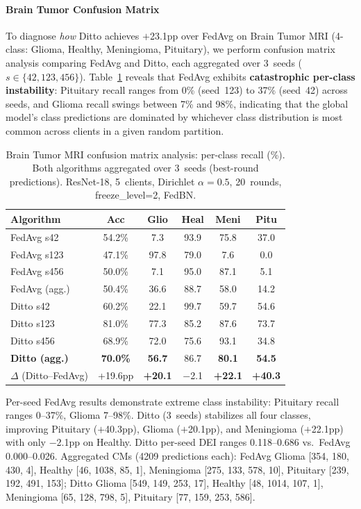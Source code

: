 \documentclass[conference]{IEEEtran}
\begin{document}
\paragraph{Brain Tumor Confusion Matrix}
\label{sec:confusion_matrix_bt}

To diagnose \textit{how} Ditto achieves $+$23.1pp over FedAvg on Brain Tumor MRI (4-class: Glioma, Healthy, Meningioma, Pituitary), we perform confusion matrix analysis comparing FedAvg and Ditto, each aggregated over 3~seeds ($s \in \{42, 123, 456\}$). Table~\ref{tab:confusion_matrix_bt} reveals that FedAvg exhibits \textbf{catastrophic per-class instability}: Pituitary recall ranges from 0\% (seed~123) to 37\% (seed~42) across seeds, and Glioma recall swings between 7\% and 98\%, indicating that the global model's class predictions are dominated by whichever class distribution is most common across clients in a given random partition.

\begin{table}[htbp]
\centering
\caption{Brain Tumor MRI confusion matrix analysis: per-class recall (\%). Both algorithms aggregated over 3~seeds (best-round predictions). ResNet-18, 5~clients, Dirichlet $\alpha{=}0.5$, 20~rounds, freeze\_level=2, FedBN.}
\label{tab:confusion_matrix_bt}
\small
\begin{tabular}{lccccc}
\toprule
\textbf{Algorithm} & \textbf{Acc} & \textbf{Glio} & \textbf{Heal} & \textbf{Meni} & \textbf{Pitu} \\
\midrule
FedAvg s42 & 54.2\% & 7.3 & 93.9 & 75.8 & 37.0 \\
FedAvg s123 & 47.1\% & 97.8 & 79.0 & 7.6 & 0.0 \\
FedAvg s456 & 50.0\% & 7.1 & 95.0 & 87.1 & 5.1 \\
\midrule
FedAvg (agg.) & 50.4\% & 36.6 & 88.7 & 58.0 & 14.2 \\
\midrule
Ditto s42 & 60.2\% & 22.1 & 99.7 & 59.7 & 54.6 \\
Ditto s123 & 81.0\% & 77.3 & 85.2 & 87.6 & 73.7 \\
Ditto s456 & 68.9\% & 72.0 & 75.6 & 93.1 & 34.8 \\
\midrule
\textbf{Ditto (agg.)} & \textbf{70.0\%} & \textbf{56.7} & 86.7 & \textbf{80.1} & \textbf{54.5} \\
\midrule
$\Delta$ (Ditto--FedAvg) & +19.6pp & \textbf{+20.1} & $-$2.1 & \textbf{+22.1} & \textbf{+40.3} \\
\bottomrule
\end{tabular}

\vspace{1mm}
\footnotesize{Per-seed FedAvg results demonstrate extreme class instability: Pituitary recall ranges 0--37\%, Glioma 7--98\%. Ditto (3~seeds) stabilizes all four classes, improving Pituitary ($+$40.3pp), Glioma ($+$20.1pp), and Meningioma ($+$22.1pp) with only $-$2.1pp on Healthy. Ditto per-seed DEI ranges 0.118--0.686 vs.\ FedAvg 0.000--0.026. Aggregated CMs (4209 predictions each): FedAvg Glioma [354, 180, 430, 4], Healthy [46, 1038, 85, 1], Meningioma [275, 133, 578, 10], Pituitary [239, 192, 491, 153]; Ditto Glioma [549, 149, 253, 17], Healthy [48, 1014, 107, 1], Meningioma [65, 128, 798, 5], Pituitary [77, 159, 253, 586].}
\end{table}
\end{document}
